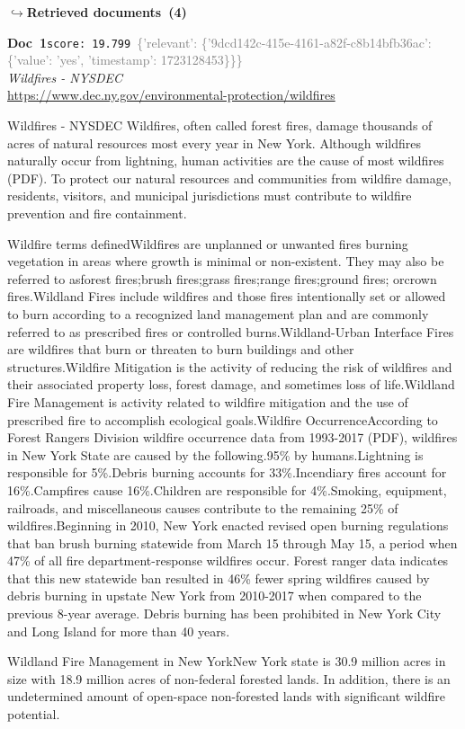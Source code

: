 \documentclass[a4paper,11pt]{article}
\begin{document}
\noindent\hfill{\footnotesize\textcolor{doccolor}{\textbf{$\hookrightarrow$\enspace Retrieved documents~(4)}}}
\begin{docenv}
{\footnotesize\textcolor{doccolor}{\textbf{Doc~1}}}\hfill{\tiny\texttt{score:~19.799}}\ {\tiny\textcolor{gray}{\{'relevant': \{'9dcd142c-415e-4161-a82f-c8b14bfb36ac': \{'value': 'yes', 'timestamp': 1723128453\}\}\}}}\\[3pt]
{\small\textit{Wildfires - NYSDEC}}\\[2pt]
{\tiny\url{https://www.dec.ny.gov/environmental-protection/wildfires}}\\[4pt]
{\footnotesize Wildfires - NYSDEC
Wildfires, often called forest fires, damage thousands of acres of natural resources most every year in New York. Although wildfires naturally occur from lightning, human activities are the cause of most wildfires (PDF). To protect our natural resources and communities from wildfire damage, residents, visitors, and municipal jurisdictions must contribute to wildfire prevention and fire containment.

Wildfire terms definedWildfires are unplanned or unwanted fires burning vegetation in areas where growth is minimal or non-existent. They may also be referred to asforest fires;brush fires;grass fires;range fires;ground fires; orcrown fires.Wildland Fires include wildfires and those fires intentionally set or allowed to burn according to a recognized land management plan and are commonly referred to as prescribed fires or controlled burns.Wildland-Urban Interface Fires are wildfires that burn or threaten to burn buildings and other structures.Wildfire Mitigation is the activity of reducing the risk of wildfires and their associated property loss, forest damage, and sometimes loss of life.Wildland Fire Management is activity related to wildfire mitigation and the use of prescribed fire to accomplish ecological goals.Wildfire OccurrenceAccording to Forest Rangers Division wildfire occurrence data from 1993-2017 (PDF), wildfires in New York State are caused by the following.95\% by humans.Lightning is responsible for 5\%.Debris burning accounts for 33\%.Incendiary fires account for 16\%.Campfires cause 16\%.Children are responsible for 4\%.Smoking, equipment, railroads, and miscellaneous causes contribute to the remaining 25\% of wildfires.Beginning in 2010, New York enacted revised open burning regulations that ban brush burning statewide from March 15 through May 15, a period when 47\% of all fire department-response wildfires occur. Forest ranger data indicates that this new statewide ban resulted in 46\% fewer spring wildfires caused by debris burning in upstate New York from 2010-2017 when compared to the previous 8-year average. Debris burning has been prohibited in New York City and Long Island for more than 40 years.

Wildland Fire Management in New YorkNew York state is 30.9 million acres in size with 18.9 million acres of non-federal forested lands. In addition, there is an undetermined amount of open-space non-forested lands with significant wildfire potential.}
\end{docenv}
\end{document}
